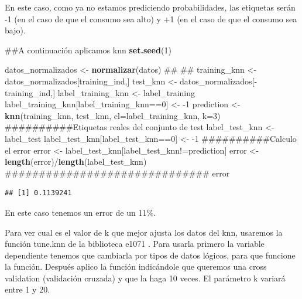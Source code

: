 \documentclass[]{article}
\newenvironment{Shaded}{\begin{snugshade}}{\end{snugshade}}
\newcommand{\KeywordTok}[1]{\textcolor[rgb]{0.13,0.29,0.53}{\textbf{{#1}}}}
\newcommand{\DataTypeTok}[1]{\textcolor[rgb]{0.13,0.29,0.53}{{#1}}}
\newcommand{\DecValTok}[1]{\textcolor[rgb]{0.00,0.00,0.81}{{#1}}}
\newcommand{\StringTok}[1]{\textcolor[rgb]{0.31,0.60,0.02}{{#1}}}
\newcommand{\NormalTok}[1]{{#1}}
\begin{document}
En este caso, como ya no estamos prediciendo probabilidades, las
etiquetas serán -1 (en el caso de que el consumo sea alto) y +1 (en el
caso de que el consumo sea bajo).

\begin{Shaded}
\begin{Highlighting}[]
\NormalTok{##A continuación aplicamos knn}
\KeywordTok{set.seed}\NormalTok{(}\DecValTok{1}\NormalTok{)}

\NormalTok{datos_normalizados <-}\StringTok{ }\KeywordTok{normalizar}\NormalTok{(datos)}
\NormalTok{##}
\NormalTok{##}
\NormalTok{training_knn <-}\StringTok{ }\NormalTok{datos_normalizados[training_ind,]}
\NormalTok{test_knn <-}\StringTok{ }\NormalTok{datos_normalizados[-training_ind,]}
\NormalTok{label_training_knn <-}\StringTok{ }\NormalTok{label_training}
\NormalTok{label_training_knn[label_training_knn==}\DecValTok{0}\NormalTok{] <-}\StringTok{ }\NormalTok{-}\DecValTok{1}
\NormalTok{prediction <-}\StringTok{ }\KeywordTok{knn}\NormalTok{(training_knn, test_knn, }\DataTypeTok{cl=}\NormalTok{label_training_knn, }\DataTypeTok{k=}\DecValTok{3}\NormalTok{)}
\NormalTok{##########Etiquetas reales del conjunto de test}
\NormalTok{label_test_knn <-}\StringTok{ }\NormalTok{label_test}
\NormalTok{label_test_knn[label_test_knn==}\DecValTok{0}\NormalTok{] <-}\StringTok{ }\NormalTok{-}\DecValTok{1}
\NormalTok{##########Calculo el error}
\NormalTok{error <-}\StringTok{ }\NormalTok{label_test_knn[label_test_knn!=prediction]}
\NormalTok{error <-}\StringTok{ }\KeywordTok{length}\NormalTok{(error)/}\KeywordTok{length}\NormalTok{(label_test_knn)}
\NormalTok{##############################}
\NormalTok{error}
\end{Highlighting}
\end{Shaded}

\begin{verbatim}
## [1] 0.1139241
\end{verbatim}

En este caso tenemos un error de un 11\%.

Para ver cual es el valor de k que mejor ajusta los datos del knn,
usaremos la función tune.knn de la biblioteca e1071 . Para usarla
primero la variable dependiente tenemos que cambiarla por tipos de datos
lógicos, para que funcione la función. Después aplico la función
indicándole que queremos una cross validation (validación cruzada) y que
la haga 10 veces. El parámetro k variará entre 1 y 20.
\end{document}
